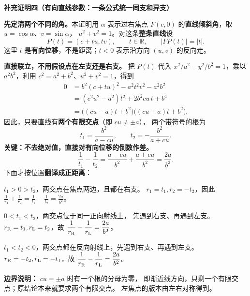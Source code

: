 \clearpage
\begin{proofbox}
  \textbf{\textcolor{CProof}{补充证明四（有向直线参数：一条公式统一同支和异支）}}

  \textbf{先定清两个不同的角。}本证明用 $\alpha$ 表示过右焦点 $F(c,0)$
  的\textbf{直线倾斜角}，取 $u=\cos\alpha$、$v=\sin\alpha$，
  $u^2+v^2=1$。对这条\textbf{整条直线}设
  \[
    P(t)=(c+tu,tv),\qquad t\in\mathbb R,\qquad |FP(t)|=|t|.
  \]
  这里 $t$ 是\textbf{有向位移}，不是距离；$t<0$ 表示沿方向 $(u,v)$ 的反向走。

  \textbf{直接联立，不用假设点在左支还是右支。}
  把 $P(t)$ 代入 $x^2/a^2-y^2/b^2=1$，乘以 $a^2b^2$，利用
  $c^2=a^2+b^2$、$u^2+v^2=1$，得到
  \[
  \begin{aligned}
    0&=b^2(c+tu)^2-a^2t^2v^2-a^2b^2\\
     &=(c^2u^2-a^2)t^2+2b^2cu\,t+b^4\\
     &=\bigl((cu-a)t+b^2\bigr)\bigl((cu+a)t+b^2\bigr).
  \end{aligned}
  \]
  因此，只要直线有\textbf{两个有限交点}（即 $cu\ne\pm a$），
  两个带符号的根为
  \[
    \boxed{t_1=\frac{b^2}{a-cu}},\qquad
    \boxed{t_2=-\frac{b^2}{a+cu}}.
  \]
  \textbf{关键：不去绝对值，直接对有向位移的倒数作差。}
  \[
    \boxed{\frac1{t_1}-\frac1{t_2}
      =\frac{a-cu}{b^2}+\frac{a+cu}{b^2}
      =\frac{2a}{b^2}}.
  \]
  下面才按位置\textbf{翻译成正距离}：
  \begin{description}[style=nextline,leftmargin=2.8em,labelsep=0.5em,itemsep=0.3em]
    \item[\textbf{同支（$|cu|<a$）：}]
    $t_1>0>t_2$，两交点在焦点两边，且都在右支。
    $r_1=t_1,r_2=-t_2$，因此
    $\displaystyle\frac1{r_1}+\frac1{r_2}=\frac1{t_1}-\frac1{t_2}=\frac{2a}{b^2}$。
    \item[\textbf{异支（$cu<-a$）：}]
    $0<t_1<t_2$，两交点位于同一正向射线上，
    先遇到右支、再遇到左支。
    $r_{\rm R}=t_1,r_{\rm L}=t_2$，故
    $\displaystyle\frac1{r_{\rm R}}-\frac1{r_{\rm L}}=\frac{2a}{b^2}$。
    \item[\textbf{异支（$cu>a$）：}]
    $t_1<t_2<0$，两交点都在反向射线上，先遇到右支、再遇到左支。
    $r_{\rm R}=-t_2,r_{\rm L}=-t_1$，故
    $\displaystyle\frac1{r_{\rm R}}-\frac1{r_{\rm L}}=\frac{2a}{b^2}$。
  \end{description}
  \textbf{边界说明：} $cu=\pm a$ 时有一个根的分母为零，
  即渐近线方向，只剩一个有限交点；原结论本来就要求两个有限交点。
  左焦点的版本由左右对称得到。
\end{proofbox}

